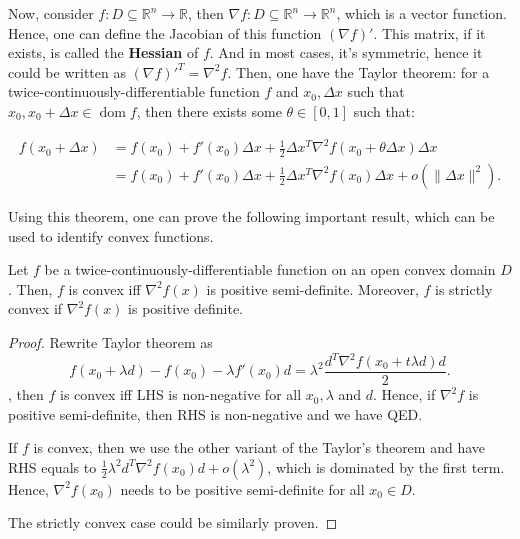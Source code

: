 Now, consider \( f: D \subseteq \mathbb{R}^{n} \to  \mathbb{R} \), then \(
\nabla f: D \subseteq \mathbb{R}^{n} \to  \mathbb{R}^{n} \), which is a vector
function. Hence, one can define the Jacobian of this function \( (\nabla f)' \).
This matrix, if it exists, is called the \textbf{Hessian} of \( f \). And in
most cases, it's symmetric, hence it could be written as \( (\nabla f)'^{T} =
\nabla ^2 f \). Then, one have the Taylor theorem: for a
twice-continuously-differentiable function \( f \) and \( x_{0}, \Delta x \)
such that \( x_{0}, x_{0} + \Delta x \in \operatorname{dom} f \), then there
exists some \( \theta \in [0, 1] \) such that:

\begin{align*}
  f(x_{0}+\Delta x) &= f(x_{0}) + f'(x_{0})\Delta x + \frac{1}{2} \Delta x^{T}
  \nabla ^2f(x_{0} + \theta \Delta x) \Delta x\\
&= f(x_{0}) + f'(x_{0})\Delta x + \frac{1}{2} \Delta x^{T}
  \nabla ^2f(x_{0}) \Delta x + o(\|\Delta x\|^2)
.\end{align*}

Using this theorem, one can prove the following important result, which can be
used to identify convex functions.

\begin{theorem}
  Let \( f \) be a twice-continuously-differentiable function on an open convex
  domain \( D \). Then, \( f \) is convex iff \( \nabla ^2 f(x) \) is
  positive semi-definite. Moreover, \( f \) is strictly convex if \( \nabla ^2
  f(x) \) is positive definite.
\end{theorem}

\begin{proof}
  Rewrite Taylor theorem as
  \[
    f(x_{0}+\lambda d)-f(x_{0})-\lambda f'(x_{0})d =\lambda^{2}
    \frac{d^{T}\nabla^{2}f(x_{0} + t\lambda d)d}{2}
  .\], then \( f \) is convex iff LHS is non-negative for all \( x_{0}, \lambda
  \) and \( d \). Hence, if \( \nabla ^2 f \) is positive semi-definite, then
  RHS is non-negative and we have QED.

  If \( f \) is convex, then we use the other variant of the Taylor's theorem
  and have RHS equals to \( \frac{1}{2}\lambda ^2 d^{T}\nabla ^2 f(x_{0})d +
  o(\lambda ^2) \), which is dominated by the first term. Hence, \( \nabla ^2
  f(x_{0}) \) needs to be positive semi-definite for all \( x_{0} \in D \).

  The strictly convex case could be similarly proven.
\end{proof}


